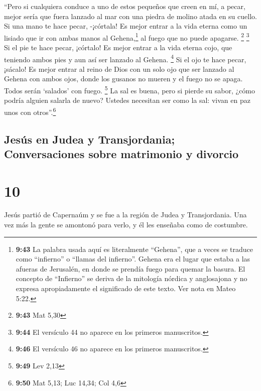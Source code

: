  ``Pero si cualquiera conduce a uno de estos pequeños que
creen en mí, a pecar, mejor sería que fuera lanzado al mar con una
piedra de molino atada en su cuello.  Si una mano te hace
pecar, -¡córtala! Es mejor entrar a la vida eterna como un lisiado que
ir con ambas manos al Gehena,\footnote{\textbf{9:43} La palabra usada
  aquí es literalmente ``Gehena'', que a veces se traduce como
  ``infierno'' o ``llamas del infierno''. Gehena era el lugar que estaba
  a las afueras de Jerusalén, en donde se prendía fuego para quemar la
  basura. El concepto de ``Infierno'' se deriva de la mitología nórdica
  y anglosajona y no expresa apropiadamente el significado de este
  texto. Ver nota en Mateo 5:22.} al fuego que no puede apagarse.
\footnote{\textbf{9:43} Mat 5,30}  \footnote{\textbf{9:44}
  El versículo 44 no aparece en los primeros manuscritos.}
 Si el pie te hace pecar, ¡córtalo! Es mejor entrar a la
vida eterna cojo, que teniendo ambos pies y aun así ser lanzado al
Gehena.  \footnote{\textbf{9:46} El versículo 46 no
  aparece en los primeros manuscritos.}  Si el ojo te
hace pecar, ¡sácalo! Es mejor entrar al reino de Dios con un solo ojo
que ser lanzado al Gehena con ambos ojos,  donde los
gusanos no mueren y el fuego no se apaga.  Todos serán
`salados' con fuego. \footnote{\textbf{9:49} Lev 2,13} 
La sal es buena, pero si pierde su sabor, ¿cómo podría alguien salarla
de nuevo? Ustedes necesitan ser como la sal: vivan en paz unos con
otros''.\footnote{\textbf{9:50} Mat 5,13; Luc 14,34; Col 4,6}

\hypertarget{jesuxfas-en-judea-y-transjordania-conversaciones-sobre-matrimonio-y-divorcio}{%
\subsection{Jesús en Judea y Transjordania; Conversaciones sobre
matrimonio y
divorcio}\label{jesuxfas-en-judea-y-transjordania-conversaciones-sobre-matrimonio-y-divorcio}}

\hypertarget{section-9}{%
\section{10}\label{section-9}}

 Jesús partió de Capernaúm y se fue a la región de Judea y
Transjordania. Una vez más la gente se amontonó para verlo, y él les
enseñaba como de costumbre.

